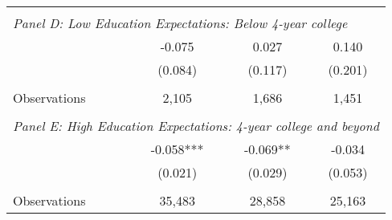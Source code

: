 {\begin{tabular}{lccc}
&  &  &   \\
\multicolumn{4}{l}{\textit{Panel D: Low Education Expectations: Below 4-year college}} \\
\hspace{3mm}        &      -0.075   &       0.027   &       0.140   \\
                    &     (0.084)   &     (0.117)   &     (0.201)   \\
                    &               &               &               \\
\hspace{3mm}Observations&       2,105   &       1,686   &       1,451   \\
 
&  &  &   \\
\multicolumn{4}{l}{\textit{Panel E: High Education Expectations: 4-year college and beyond}} \\
\hspace{3mm}        &      -0.058***&      -0.069** &      -0.034   \\
                    &     (0.021)   &     (0.029)   &     (0.053)   \\
                    &               &               &               \\
\hspace{3mm}Observations&      35,483   &      28,858   &      25,163   \\
 

\bottomrule
\end{tabular}
}

